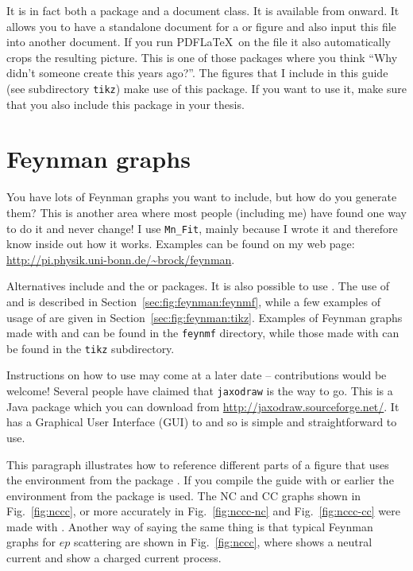 It is in fact both a package and a document class. It is
available from  onward. It allows you to have a
standalone document for a  or  figure
and also input this file into another document. If you run PDF\LaTeX\
on the file it also automatically crops the resulting picture. This is
one of those packages where you think \enquote{Why didn't someone
  create this years ago?}. The \TikZ figures that I include in this
guide (see subdirectory \texttt{tikz}) make use of this package. If
you want to use it, make sure that you also include this package in
your thesis.


\section{Feynman graphs}
\label{sec:fig:feynman}

You have lots of Feynman graphs you want to include, but how do you
generate them? This is another area where most people (including me)
have found one way to do it and never change! I use \texttt{Mn\_Fit},
mainly because I wrote it and therefore know inside out how it
works. Examples can be found on my web page:
\url{http://pi.physik.uni-bonn.de/~brock/feynman}.

Alternatives include  and the  or
\Package{feynmp} packages.  It is also possible to use
. The use of \Package{feynmf} and  is
described in Section~\ref{sec:fig:feynman:feynmf}, while a few
examples of usage of  are given in
Section~\ref{sec:fig:feynman:tikz}. Examples of Feynman graphs made
with \Package{feynmf} and \Package{feynmp} can be found in the
\texttt{feynmf} directory, while those made with  can
be found in the \texttt{tikz} subdirectory.

Instructions on how to use  may come at a later
date -- contributions would be welcome! Several people have claimed
that \texttt{jaxodraw} is the way to go. This is a Java package which
you can download from \url{http://jaxodraw.sourceforge.net/}. It has
a Graphical User Interface (GUI) to \Package{axodraw} and so is simple and
straightforward to use.

This paragraph illustrates how to reference different parts of a
figure that uses the environment \Env{subfigure} from the package .
If you compile the guide with \TeXLive 2011 or earlier the
environment  from the package  is used.
The NC and CC graphs shown in
Fig.~\ref{fig:nccc}, or more accurately in Fig.~\ref{fig:nccc-nc} and
Fig.~\ref{fig:nccc-cc} were made with \Package{feynmp}. Another way of
saying the same thing is that typical Feynman graphs for $ep$
scattering are shown in Fig.~\ref{fig:nccc}, where
 shows a neutral current and 
show a charged current process.


